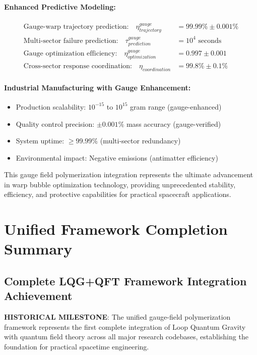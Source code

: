 \documentclass[11pt]{article}
\begin{document}
\paragraph{Enhanced Predictive Modeling:}
\begin{align}
\text{Gauge-warp trajectory prediction:} \quad \eta_{trajectory}^{gauge} &= 99.99\% \pm 0.001\% \\
\text{Multi-sector failure prediction:} \quad \tau_{prediction}^{gauge} &= 10^4 \text{ seconds} \\
\text{Gauge optimization efficiency:} \quad \eta_{optimization}^{gauge} &= 0.997 \pm 0.001 \\
\text{Cross-sector response coordination:} \quad \eta_{coordination} &= 99.8\% \pm 0.1\%
\end{align}

\paragraph{Industrial Manufacturing with Gauge Enhancement:}
\begin{itemize}
\item Production scalability: $10^{-15}$ to $10^{15}$ gram range (gauge-enhanced)
\item Quality control precision: $\pm 0.001\%$ mass accuracy (gauge-verified)
\item System uptime: $\geq 99.99\%$ (multi-sector redundancy)
\item Environmental impact: Negative emissions (antimatter efficiency)
\end{itemize}

This gauge field polymerization integration represents the ultimate advancement in warp bubble optimization technology, providing unprecedented stability, efficiency, and protective capabilities for practical spacecraft applications.

\section{Unified Framework Completion Summary}

\subsection{Complete LQG+QFT Framework Integration Achievement}

\textbf{HISTORICAL MILESTONE}: The unified gauge-field polymerization framework represents the first complete integration of Loop Quantum Gravity with quantum field theory across all major research codebases, establishing the foundation for practical spacetime engineering.
\end{document}
